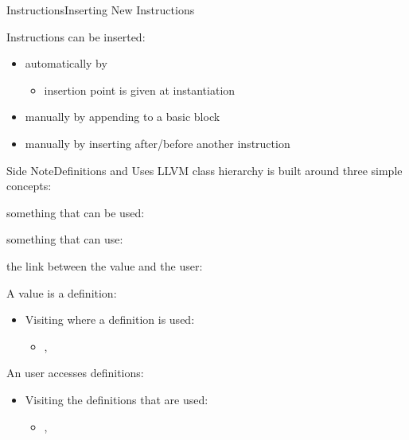 \begin{frame}{Instructions}{Inserting New Instructions}


\vfill
Instructions can be inserted:
\vfill
\begin{itemize}
\item automatically by 
\begin{itemize}
\item insertion point is given at  instantiation
\end{itemize}
\bigskip
\item manually by appending to a basic block
\item manually by inserting after/before another instruction
\end{itemize}
\vfill
\end{frame}


\begin{frame}{Side Note}{Definitions and Uses}
LLVM class hierarchy is built around three simple concepts:

\begin{description}[valueMMM]
\item[value] something that can be used: 
\item[user] something that can use: 
\item[use] the link between the \alert{value} and the \alert{user}: 
\end{description}
\medskip
A value is a \alert{definition}:

\begin{itemize}
\item Visiting where a definition is used:
\begin{itemize}
\item {}, 
\end{itemize}
\end{itemize}
\medskip
An user accesses \alert{definitions}:

\begin{itemize}
\item Visiting the definitions that are used:
\begin{itemize}
\item {}, 
\end{itemize}
\end{itemize}
\medskip

\end{frame}


